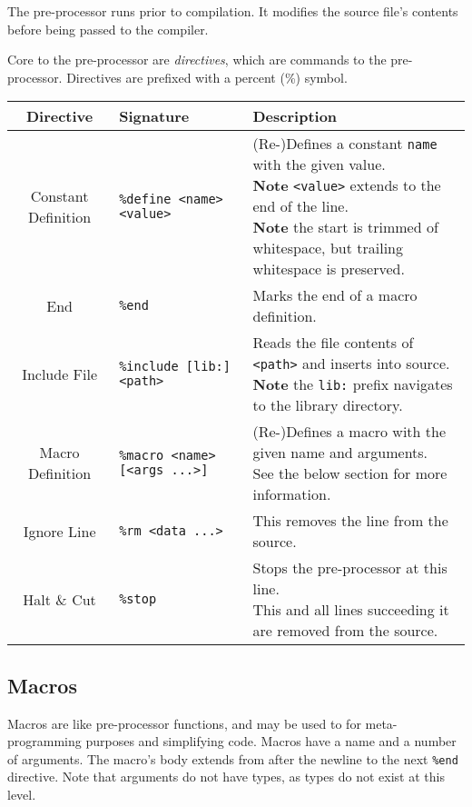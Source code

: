 \documentclass{article}
\begin{document}
The pre-processor runs prior to compilation.
It modifies the source file's contents before being passed to the compiler.

Core to the pre-processor are \textit{directives}, which are commands to the pre-processor.
Directives are prefixed with a percent (\%) symbol.

\medskip
\begin{longtable}{|c|l|l|}
    \hline
    \textbf{Directive} & \textbf{Signature} & \textbf{Description} \\
    \hline
    Constant Definition & \texttt{\%define <name> <value>} & \makecell[l]{(Re-)Defines a constant \texttt{name} with the given value.\\%
    \textbf{Note} \texttt{<value>} extends to the end of the line.\\%
    \textbf{Note} the start is trimmed of whitespace, but trailing\\%
    whitespace is preserved.} \\
    \hline
    End & \texttt{\%end} & Marks the end of a macro definition. \\
    \hline
    Include File & \texttt{\%include [lib:]<path>} & \makecell[l]{Reads the file contents of \texttt{<path>} and inserts into source.\\%
    \textbf{Note} the \texttt{lib:} prefix navigates to the library directory.} \\
    \hline
    Macro Definition & \texttt{\%macro <name> [<args ...>]} & \makecell[l]{(Re-)Defines a macro with the given name and arguments.\\%
    See the below section for more information.} \\
    \hline
    Ignore Line & \texttt{\%rm <data ...>} & This removes the line from the source. \\
    \hline
    Halt \& Cut & \texttt{\%stop} & \makecell[l]{Stops the pre-processor at this line.\\%
    This and all lines succeeding it are removed from the source.} \\
    \hline
\end{longtable}

\subsection{Macros}

Macros are like pre-processor functions, and may be used to for meta-programming purposes and simplifying code.
Macros have a name and a number of arguments.
The macro's body extends from after the newline to the next \texttt{\%end} directive.
Note that arguments do not have types, as types do not exist at this level.
\end{document}
